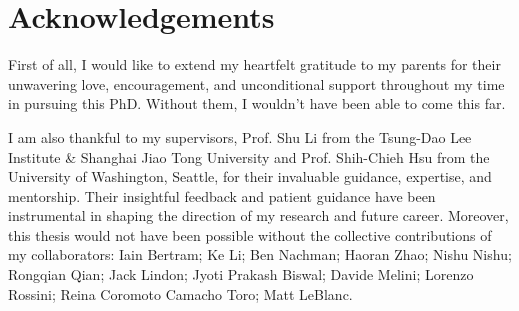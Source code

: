 \documentclass[UTF8,12pt]{ctexart}
\numberwithin{equation}{section}
\begin{document}
\newpage
{}
\section{Acknowledgements}
First of all, I would like to extend my heartfelt gratitude to my parents for their unwavering love, encouragement, and unconditional support throughout my time in pursuing this PhD. Without them, I wouldn't have been able to come this far. 

I am also thankful to my supervisors, Prof. Shu Li from the Tsung-Dao Lee Institute \& Shanghai Jiao Tong University and Prof. Shih-Chieh Hsu from the University of Washington, Seattle, for their invaluable guidance, expertise, and mentorship. Their insightful feedback and patient guidance have been instrumental in shaping the direction of my research and future career. Moreover, this thesis would not have been possible without the collective contributions of my collaborators: Iain Bertram; Ke Li; Ben Nachman; Haoran Zhao; Nishu Nishu; Rongqian Qian; Jack Lindon;  Jyoti Prakash Biswal; Davide Melini; Lorenzo Rossini; Reina Coromoto Camacho Toro; Matt LeBlanc.

\end{document}
